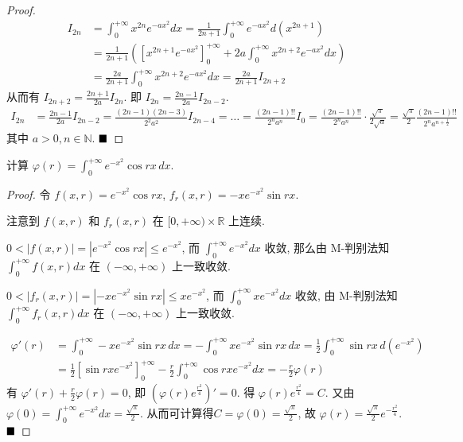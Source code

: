 \documentclass[lang=cn,newtx,10pt,scheme=chinese]{elegantbook}
\begin{document}
\begin{proof}
\begin{align*}
I_{2n} &= \int_0^{+\infty} x^{2n} e^{-ax^2} dx = \frac{1}{2n+1} \int_0^{+\infty} e^{-ax^2} d(x^{2n+1}) \\
&= \frac{1}{2n+1} \left( \left[ x^{2n+1} e^{-ax^2} \right]_0^{+\infty} + 2a \int_0^{+\infty} x^{2n+2} e^{-ax^2} dx \right) \\
&= \frac{2a}{2n+1} \int_0^{+\infty} x^{2n+2} e^{-ax^2} dx = \frac{2a}{2n+1} I_{2n+2}
\end{align*}
从而有 $I_{2n+2} = \frac{2n+1}{2a} I_{2n}$. 即 $I_{2n} = \frac{2n-1}{2a} I_{2n-2}$.
\begin{align*}
I_{2n} &= \frac{2n-1}{2a} I_{2n-2} = \frac{(2n-1)(2n-3)}{2^2 a^2} I_{2n-4} = \dots = \frac{(2n-1)!!}{2^n a^n} I_0 = \frac{(2n-1)!!}{2^n a^n} \cdot \frac{\sqrt{\pi}}{2\sqrt{a}} = \frac{\sqrt{\pi}}{2} \frac{(2n-1)!!}{2^n a^{n+\frac{1}{2}}}
\end{align*}
其中 $a>0, n \in \mathbb{N}$.
$\hfill \blacksquare$
\end{proof}

\begin{example}[$\bigstar \bigstar$]
计算 $\varphi(r) = \int_{0}^{+\infty} e^{-x^2} \cos rx \, dx$.
\end{example}

\begin{proof}
令 $f(x,r) = e^{-x^2}\cos rx$, $f_r(x,r) = -x e^{-x^2}\sin rx$. 

注意到 $f(x,r)$ 和 $f_r(x,r)$ 在 $[0, +\infty) \times \mathbb{R}$ 上连续.

$0 < |f(x,r)| = |e^{-x^2}\cos rx| \le e^{-x^2}$, 而 $\int_0^{+\infty} e^{-x^2} dx$ 收敛, 那么由 M-判别法知 $\int_{0}^{+\infty}f(x,r) dx$ 在 $(-\infty, +\infty)$ 上一致收敛.

$0 < |f_r(x,r)| = |-x e^{-x^2} \sin rx| \le x e^{-x^2}$, 而 $\int_0^{+\infty} x e^{-x^2} dx$ 收敛, 由 M-判别法知 $\int_{0}^{+\infty}f_r(x,r) dx$ 在 $(-\infty, +\infty)$ 上一致收敛.

\begin{align*}
\varphi'(r) &= \int_0^{+\infty} -x e^{-x^2} \sin rx \, dx = -\int_0^{+\infty} x e^{-x^2} \sin rx \, dx = \frac{1}{2} \int_0^{+\infty} \sin rx \, d(e^{-x^2}) \\
&= \frac{1}{2} \left[ \sin rx e^{-x^2} \right]_0^{+\infty} - \frac{r}{2} \int_0^{+\infty} \cos rx e^{-x^2} dx = -\frac{r}{2}\varphi(r)
\end{align*}
有 $\varphi'(r) + \frac{r}{2} \varphi(r) = 0$, 即 $\left( \varphi(r) e^{\frac{r^2}{4}} \right)' = 0$.
得 $\varphi(r) e^{\frac{r^2}{4}} = C$. 又由 $\varphi(0) = \int_0^{+\infty} e^{-x^2} dx = \frac{\sqrt{\pi}}{2}$.
从而可计算得$C = \varphi(0) = \frac{\sqrt{\pi}}{2}$, 故 $\varphi(r) = \frac{\sqrt{\pi}}{2} e^{-\frac{r^2}{4}}$.
$\hfill \blacksquare$
\end{proof}
\end{document}
